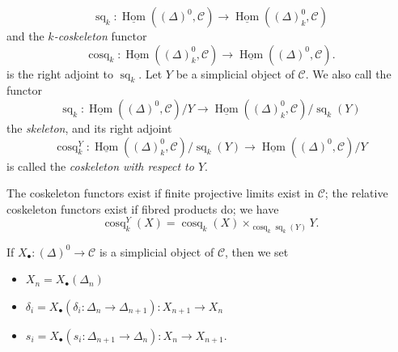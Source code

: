     \[       \operatorname {sq}_k\colon        \underline {\operatorname {Hom}}((\Delta )^0,\mathscr {C})       \to  \underline {\operatorname {Hom}}((\Delta )_k^0,\mathscr {C})     \]
    and the \emph{\(k\)-coskeleton} functor
    \[       \operatorname {cosq}_k\colon        \underline {\operatorname {Hom}}((\Delta )_k^0,\mathscr {C})       \to  \underline {\operatorname {Hom}}((\Delta )^0,\mathscr {C}).     \]
    is the right adjoint to \(\operatorname {sq}_k\).
    Let \(Y\) be a simplicial object of \(\mathscr {C}\).
    We also call the functor
    \[       \operatorname {sq}_k\colon        \underline {\operatorname {Hom}}((\Delta )^0,\mathscr {C})/Y       \to  \underline {\operatorname {Hom}}((\Delta )_k^0,\mathscr {C})/\operatorname {sq}_k(Y)     \]
    the \emph{skeleton}, and its right adjoint
    \[       \operatorname {cosq}_k^Y\colon        \underline {\operatorname {Hom}}((\Delta )_k^0,\mathscr {C})/\operatorname {sq}_k(Y)       \to  \underline {\operatorname {Hom}}((\Delta )^0,\mathscr {C})/Y     \]
    is called the \emph{coskeleton with respect to \(Y\)}.\par{}The coskeleton functors exist if finite projective limits exist in \(\mathscr {C}\);
    the relative coskeleton functors exist if fibred products do;
    we have
    \[       \operatorname {cosq}_k^Y(X)       = \operatorname {cosq}_k(X) \times _{\operatorname {cosq}_k\operatorname {sq}_k(Y)}Y.     \]\label{hodge-theory-iii-5.1.2}\par{}If \(X_\bullet \colon (\Delta )^0\to \mathscr {C}\) is a simplicial object of \(\mathscr {C}\), then we set

    \begin{itemize}\item{}\(X_n = X_\bullet (\Delta _n)\)
      \item{}\(\delta _i = X_\bullet (\delta _i\colon \Delta _n\to \Delta _{n+1})\colon  X_{n+1}\to  X_n\)
      \item{}\(s_i = X_\bullet (s_i\colon \Delta _{n+1}\to \Delta _n)\colon  X_n\to  X_{n+1}\).\end{itemize}

